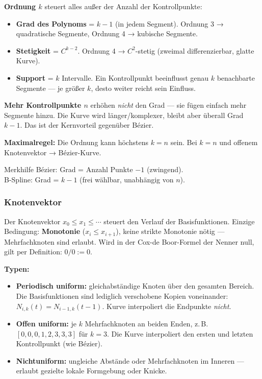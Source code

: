 \documentclass[12pt, a4paper]{article}
\begin{document}
\textbf{Ordnung $k$} steuert alles außer der Anzahl der Kontrollpunkte:
\begin{itemize}
  \item \textbf{Grad des Polynoms} = $k-1$ (in jedem Segment). Ordnung 3 → quadratische Segmente, Ordnung 4 → kubische Segmente.
  \item \textbf{Stetigkeit} = $C^{k-2}$. Ordnung 4 → $C^2$-stetig (zweimal differenzierbar, glatte Kurve).
  \item \textbf{Support} = $k$ Intervalle. Ein Kontrollpunkt beeinflusst genau $k$ benachbarte Segmente — je größer $k$, desto weiter reicht sein Einfluss.
\end{itemize}

\textbf{Mehr Kontrollpunkte $n$} erhöhen \textit{nicht} den Grad — sie fügen einfach mehr Segmente hinzu. Die Kurve wird länger/komplexer, bleibt aber überall Grad $k-1$. Das ist der Kernvorteil gegenüber Bézier.

\textbf{Maximalregel:} Die Ordnung kann höchstens $k = n$ sein. Bei $k = n$ und offenem Knotenvektor → Bézier-Kurve.

\begin{notebox}{Merkhilfe}
Bézier: Grad = Anzahl Punkte $- 1$ (zwingend). \\
B-Spline: Grad = $k-1$ (frei wählbar, unabhängig von $n$).
\end{notebox}

\subsubsection*{Knotenvektor}

Der Knotenvektor $x_0 \leq x_1 \leq \cdots$ steuert den Verlauf der Basisfunktionen. Einzige Bedingung: \textbf{Monotonie} ($x_i \leq x_{i+1}$), keine strikte Monotonie nötig — Mehrfachknoten sind erlaubt. Wird in der Cox-de Boor-Formel der Nenner null, gilt per Definition: $0/0 := 0$.

\textbf{Typen:}
\begin{itemize}
  \item \textbf{Periodisch uniform:} gleichabständige Knoten über den gesamten Bereich. Die Basisfunktionen sind lediglich verschobene Kopien voneinander: $N_{i,k}(t) = N_{i-1,k}(t-1)$. Kurve interpoliert die Endpunkte \textit{nicht}.
  \item \textbf{Offen uniform:} je $k$ Mehrfachknoten an beiden Enden, z.\,B.\ $[0,0,0,1,2,3,3,3]$ für $k=3$. Die Kurve interpoliert den ersten und letzten Kontrollpunkt (wie Bézier).
  \item \textbf{Nichtuniform:} ungleiche Abstände oder Mehrfachknoten im Inneren — erlaubt gezielte lokale Formgebung oder Knicke.
\end{itemize}
\end{document}
